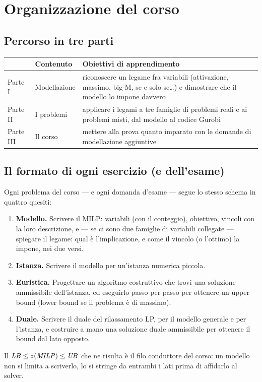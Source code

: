 \chapter{Organizzazione del corso}
\label{cap:organizzazione}

\section{Percorso in tre parti}

\begin{center}\small
\begin{tabular}{lp{4cm}p{7cm}}
\toprule
& Contenuto & Obiettivi di apprendimento \\
\midrule
Parte I & Modellazione & riconoscere un legame fra variabili (attivazione, massimo,
big-M, se e solo se\ldots) e dimostrare che il modello lo impone davvero \\
Parte II & I problemi & applicare i legami a tre famiglie di problemi reali e ai problemi misti,
dal modello al codice Gurobi \\
Parte III & Il corso & mettere alla prova quanto imparato con le domande di
modellazione aggiuntive \\
\bottomrule
\end{tabular}
\end{center}

\section{Il formato di ogni esercizio (e dell'esame)}

Ogni problema del corso --- e ogni domanda d'esame --- segue lo stesso schema
in quattro quesiti:
\begin{enumerate}
\item \textbf{Modello.} Scrivere il MILP: variabili (con il conteggio),
      obiettivo, vincoli con la loro descrizione, e --- se ci sono due
      famiglie di variabili collegate --- spiegare il legame: qual è
      l'implicazione, e come il vincolo (o l'ottimo) la impone, nei due versi.
\item \textbf{Istanza.} Scrivere il modello per un'istanza numerica piccola.
\item \textbf{Euristica.} Progettare un algoritmo costruttivo che trovi una
      soluzione ammissibile dell'istanza, ed eseguirlo passo per passo per
      ottenere un upper bound (lower bound se il problema è di massimo).
\item \textbf{Duale.} Scrivere il duale del rilassamento LP, per il modello
      generale e per l'istanza, e costruire a mano una soluzione duale
      ammissibile per ottenere il bound dal lato opposto.
\end{enumerate}
Il $\mathit{LB} \le z(\mathit{MILP}) \le \mathit{UB}$ che ne risulta è il filo conduttore del corso: un
modello non si limita a scriverlo, lo si stringe da entrambi i lati prima di
affidarlo al solver.

